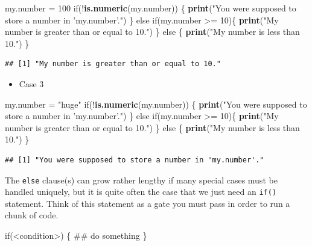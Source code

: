 \documentclass[]{book}
\newenvironment{Shaded}{\begin{snugshade}}{\end{snugshade}}
\newcommand{\KeywordTok}[1]{\textcolor[rgb]{0.13,0.29,0.53}{\textbf{{#1}}}}
\newcommand{\DecValTok}[1]{\textcolor[rgb]{0.00,0.00,0.81}{{#1}}}
\newcommand{\StringTok}[1]{\textcolor[rgb]{0.31,0.60,0.02}{{#1}}}
\newcommand{\NormalTok}[1]{{#1}}
\providecommand{\tightlist}{%
  \setlength{\itemsep}{0pt}\setlength{\parskip}{0pt}}
\begin{document}
\begin{Shaded}
\begin{Highlighting}[]
\NormalTok{my.number =}\StringTok{ }\DecValTok{100}
\NormalTok{if(!}\KeywordTok{is.numeric}\NormalTok{(my.number)) \{}
  \KeywordTok{print}\NormalTok{(}\StringTok{"You were supposed to store a number in 'my.number'."}\NormalTok{)}
\NormalTok{\} else if(my.number >=}\StringTok{ }\DecValTok{10}\NormalTok{)\{}
  \KeywordTok{print}\NormalTok{(}\StringTok{"My number is greater than or equal to 10."}\NormalTok{)}
\NormalTok{\} else \{}
  \KeywordTok{print}\NormalTok{(}\StringTok{"My number is less than 10."}\NormalTok{)}
\NormalTok{\}}
\end{Highlighting}
\end{Shaded}

\begin{verbatim}
## [1] "My number is greater than or equal to 10."
\end{verbatim}

\begin{itemize}
\tightlist
\item
  Case 3
\end{itemize}

\begin{Shaded}
\begin{Highlighting}[]
\NormalTok{my.number =}\StringTok{ "huge"}
\NormalTok{if(!}\KeywordTok{is.numeric}\NormalTok{(my.number)) \{}
  \KeywordTok{print}\NormalTok{(}\StringTok{"You were supposed to store a number in 'my.number'."}\NormalTok{)}
\NormalTok{\} else if(my.number >=}\StringTok{ }\DecValTok{10}\NormalTok{)\{}
  \KeywordTok{print}\NormalTok{(}\StringTok{"My number is greater than or equal to 10."}\NormalTok{)}
\NormalTok{\} else \{}
  \KeywordTok{print}\NormalTok{(}\StringTok{"My number is less than 10."}\NormalTok{)}
\NormalTok{\}}
\end{Highlighting}
\end{Shaded}

\begin{verbatim}
## [1] "You were supposed to store a number in 'my.number'."
\end{verbatim}

The \texttt{else} clause(s) can grow rather lengthy if many special
cases must be handled uniquely, but it is quite often the case that we
just need an \texttt{if()} statement. Think of this statement as a gate
you must pass in order to run a chunk of code.

\begin{Shaded}
\begin{Highlighting}[]
\NormalTok{if(<condition>) \{}
  \NormalTok{## do something}
\NormalTok{\}}
\end{Highlighting}
\end{Shaded}
\end{document}
